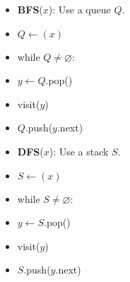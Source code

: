\documentclass{standalone}
\let\emptyset\varnothing
\begin{document}
  \begin{minipage}{0.48\linewidth}
      \begin{itemize}\setlength{\itemsep}{-4pt}
      \item \textbf{BFS}($x$): Use a queue $Q$.
      \item[] \quad $Q \gets (x)$
      \item[] \quad while $Q \neq \emptyset$:
      \item[] \quad \quad $y \gets Q$.pop()
      \item[] \quad \quad visit($y$)
      \item[] \quad \quad $Q$.push($y$.next)
      \end{itemize}
  \end{minipage}
  \hfill
  \begin{minipage}{0.48\linewidth}
      \begin{itemize}\setlength{\itemsep}{-4pt}
      \item \textbf{DFS}($x$): Use a stack $S$.
      \item[] \quad $S \gets (x)$
      \item[] \quad while $S \neq \emptyset$:
      \item[] \quad \quad $y \gets S$.pop()
      \item[] \quad \quad visit($y$)
      \item[] \quad \quad $S$.push($y$.next)
      \end{itemize}
  \end{minipage}
\end{document}
